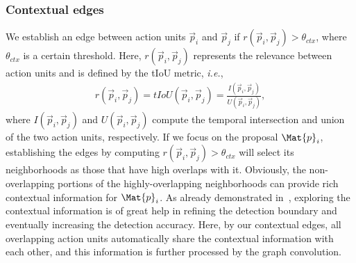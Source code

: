 \documentclass[10pt,journal,compsoc]{IEEEtran}
\begin{document}
	
	\subsubsection{Contextual edges}
	We establish an edge between action units $\Vec{p}_{i}$ and $\Vec{p}_{j}$ if $r(\Vec{p}_{i}, \Vec{p}_{j})> \theta_{ctx}$, where $\theta_{ctx}$ is a certain threshold.
	Here, $r(\Vec{p}_{i}, \Vec{p}_{j})$ represents the relevance between action units and is defined by the tIoU metric, \emph{i.e.}, 
	\begin{eqnarray}
	\label{Eq:relevance}
	r(\Vec{p}_{i}, \Vec{p}_{j}) = tIoU(\Vec{p}_{i}, \Vec{p}_{j})= \frac{I(\Vec{p}_{i}, \Vec{p}_{j})}{U(\Vec{p}_{i}, \Vec{p}_{j})},
	\end{eqnarray}
	where $I(\Vec{p}_{i}, \Vec{p}_{j})$ and $U(\Vec{p}_{i}, \Vec{p}_{j})$ compute the temporal intersection and union of the two action units, respectively. If we focus on the proposal $\Mat{p}_i$, establishing the edges by computing $r(\Vec{p}_{i}, \Vec{p}_{j})>\theta_{ctx}$ will select its neighborhoods as those that have high overlaps with it.  
	Obviously, the non-overlapping portions of the highly-overlapping neighborhoods can provide rich contextual information for $\Mat{p}_i$. As already demonstrated in~\cite{dai2017temporal,chao2018rethinking}, exploring the contextual information is of great help in refining the detection boundary and eventually increasing the detection accuracy. Here, by our contextual edges, all overlapping action units automatically share the contextual information with each other, and this information is further processed by the graph convolution.
	
	
\end{document}

